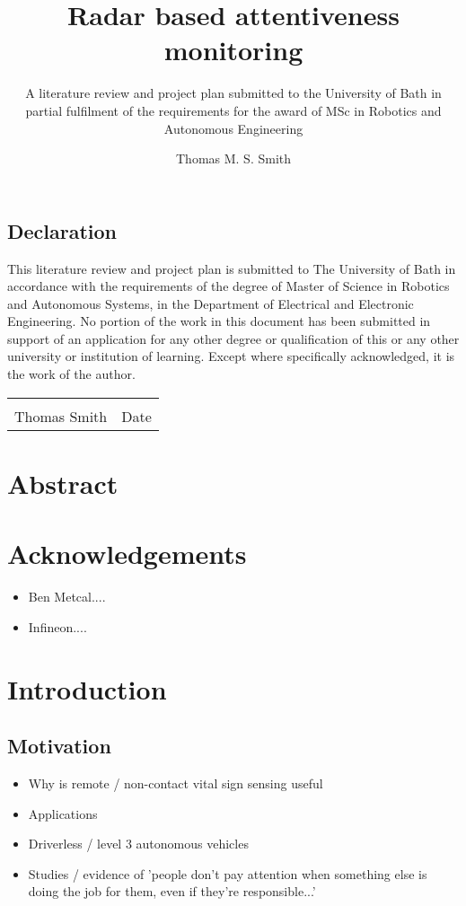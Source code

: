 \documentclass[11pt, parskip=half*,twoside=false]{scrbook}
\title{Radar based attentiveness monitoring}
\author{Thomas M. S. Smith}
\subtitle{A literature review and project plan submitted to the University of Bath in partial fulfilment of the requirements for the award of MSc in Robotics and Autonomous Engineering}
\begin{document}
\maketitle

\frontmatter

\section*{Declaration}

This literature review and project plan is submitted to The University of Bath in accordance with the requirements of the degree of Master of Science in Robotics and Autonomous Systems, in the Department of Electrical and Electronic Engineering. No portion of the work in this document has been submitted in support of an application for any other degree or qualification of this or any other university or institution of learning. Except where specifically acknowledged, it is the work of the author.

\vskip 2cm
\noindent\begin{tabular}{@{}p{}p{}@{}}
	\dotfill                         & \dotfill\\
	Thomas Smith              & Date\\
\end{tabular} 


\chapter*{Abstract}

\tableofcontents

\chapter*{Acknowledgements}
\begin{itemize}
	\item Ben Metcal....
	\item Infineon....
\end{itemize}

\mainmatter


\chapter{Introduction}
\section{Motivation}
\begin{itemize}
	\item Why is remote / non-contact vital sign sensing useful
	\item Applications
	\item Driverless / level 3 autonomous vehicles
	\item Studies / evidence of 'people don't pay attention when something else is doing the job for them, even if they're responsible...'
\end{itemize}
\end{document}
